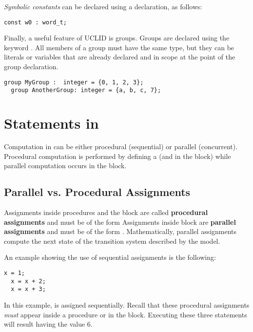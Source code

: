  
{\em Symbolic constants} can be declared using a 
 declaration, as follows:
\begin{lstlisting}[language=uclid,style=uclidstyle]
  const w0 : word_t;
\end{lstlisting}


Finally, a useful feature of UCLID is groups. Groups are declared using the keyword . All members of a group must have the same type, but they can be literals or variables that are already declared and in scope at the point of the group declaration.
\begin{lstlisting}[language=uclid,style=uclidstyle]
  group MyGroup :  integer = {0, 1, 2, 3};
  group AnotherGroup: integer = {a, b, c, 7};
\end{lstlisting}


\section{Statements in \uclid{}}

Computation in \uclid{} can be either procedural (sequential) or parallel (concurrent). Procedural computation is performed by defining a  (and in the  block) while parallel computation occurs in the  block.

\subsection{Parallel vs. Procedural Assignments}
Assignments inside procedures and the  block are called \textbf{procedural assignments} and must be of the form  Assignments inside  block are \textbf{parallel assignments} and must be of the form . Mathematically, parallel assignments compute the next state of the transition system described by the model.

An example showing the use of sequential assignments is the following:

\begin{lstlisting}[language=uclid,style=uclidstyle]
  x = 1;
  x = x + 2;
  x = x + 3;
\end{lstlisting}

	In this example,  is assigned sequentially.  Recall that these procedural assignments \emph{must} appear inside a procedure or in the  block. Executing these three statements will result  having the value 6.

